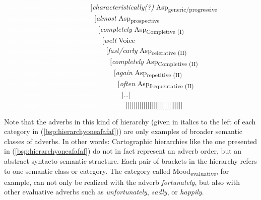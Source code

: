 \begin{exe}
{\textcolor{white}{nnnnnnnnnnnnnnnnnnnnnn}$[$\textit{characteristically(?)} Asp\textsubscript{generic/progressive} \\
\textcolor{white}{nnnnnnnnnnnnnnnnnnnnnnn}$[$\textit{almost} Asp\textsubscript{prospective} \\
\textcolor{white}{nnnnnnnnnnnnnnnnnnnnnnnn}$[$\textit{completely} Asp\textsubscript{Completive (I)} \\
\textcolor{white}{nnnnnnnnnnnnnnnnnnnnnnnnn}$[$\textit{well} Voice \\
\textcolor{white}{nnnnnnnnnnnnnnnnnnnnnnnnnn}$[$\textit{fast/early} Asp\textsubscript{celerative (II)} \\
\textcolor{white}{nnnnnnnnnnnnnnnnnnnnnnnnnnn}$[$\textit{completely} Asp\textsubscript{Completive (II)} \\
\textcolor{white}{nnnnnnnnnnnnnnnnnnnnnnnnnnnn}$[$\textit{again} Asp\textsubscript{repetitive (II)} \\
\textcolor{white}{nnnnnnnnnnnnnnnnnnnnnnnnnnnnn}$[$\textit{often} Asp\textsubscript{frequentative (II)} \\
\textcolor{white}{nnnnnnnnnnnnnnnnnnnnnnnnnnnnnn}$[$\dots$]$ \\
\textcolor{white}{nnnnnnnnnnnnnnnnnnnnnnnnnnnnnnn}$]]]]]]]]]]]]]]]]]]]]]]]]]]]]]$ }
\end{exe}

\noindent Note that the adverbs in this kind of hierarchy (given in italics to the left of each category in (\ref{bsp:hierarchyoneafafaf})) are only examples of broader semantic classes of adverbs. In other words: Cartographic hierarchies like the one presented in (\ref{bsp:hierarchyoneafafaf}) do not in fact represent an adverb order, but an abstract syntacto-semantic structure. Each pair of brackets in the hierarchy refers to one semantic class or category. The category called Mood\textsubscript{evaluative}, for example, can not only be realized with the adverb \textit{fortunately}, but also with other evaluative adverbs such as \textit{unfortunately}, \textit{sadly}, or \textit{happily}.

